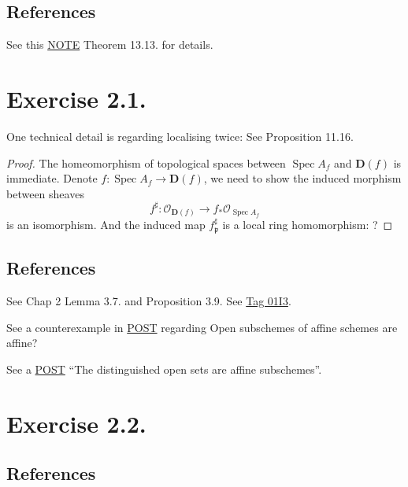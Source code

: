 \subsection{References}

See this \href{https://math.mit.edu/~mckernan/Teaching/09-10/Autumn/18.725/l_13.pdf}{NOTE} Theorem 13.13. for details.

\section{Exercise 2.1.}\label{Hart Ex 2.1.}

One technical detail is regarding localising twice: See \cite{altman2013term} Proposition 11.16.

\begin{proof}
The homeomorphism of topological spaces between $\operatorname{Spec}A_f$ and $\mathbf D(f)$ is immediate. Denote $f:\operatorname{Spec}A_f\to \mathbf D(f)$, we need to show the induced morphism between sheaves
\[f^{\sharp}:\mathcal O_{\mathbf D(f)}\to f_{\ast}\mathcal O_{\operatorname{Spec}A_f}\] is an isomorphism. And the induced map $f^{\sharp}_{\mathfrak p}$ is a local ring homomorphism: ?

\end{proof}

\subsection{References}

See \cite{qing2006algebraic} Chap 2 Lemma 3.7. and Proposition 3.9. 
See \href{https://stacks.math.columbia.edu/tag/01I3}{Tag 01I3}.

See a counterexample in \href{https://math.stackexchange.com/questions/509009/open-subschemes-of-affine-schemes-are-affine/509018#509018}{POST} regarding Open subschemes of affine schemes are affine?

See a \href{https://math.stackexchange.com/questions/408507/the-distinguished-open-sets-are-affine-subschemes}{POST} \enquote{The distinguished open sets are affine subschemes}.

\section{Exercise 2.2.}

\subsection{References}

